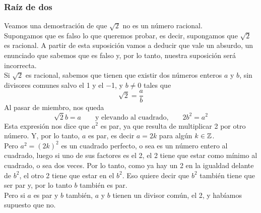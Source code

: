 \documentclass[../Teoría.root.tex]{subfiles}
\begin{document}
\subsubsection{Raíz de dos}
Veamos una demostración de que \(\sqrt{2}\) no es un número racional.\\
Supongamos que es falso lo que queremos probar, es decir, supongamos que \(\sqrt{2}\) es racional.
A partir de esta suposición vamos a deducir que vale un absurdo, un enunciado que sabemos que es falso y, por lo tanto, nuestra suposición será incorrecta.\\
Si \(\sqrt{2}\) es racional, sabemos que tienen que existir dos números enteros \(a\) y \(b\), sin divisores comunes salvo el 1 y el −1, y \(b \neq 0\) tales que \[\sqrt{2}=\frac{a}{b}\] Al pasar de miembro, nos queda
\[\sqrt{2}b=a\qquad\text{y elevando al cuadrado,}\qquad 2b^2=a^2\]
Esta expresión nos dice que \(a^2\) es par, ya que resulta de multiplicar 2 por otro número.
Y, por lo tanto, \(a\) es par, es decir \(a = 2k\) para algún \(k \in \mathbb{Z}\).\\
Pero \(a^2 = (2k)^2\) es un cuadrado perfecto, o sea es un número entero al cuadrado, luego si uno de sus factores es el 2, el 2 tiene que estar como mínimo al cuadrado, o sea dos veces.
Por lo tanto, como ya hay un 2 en la igualdad delante de \(b^2\), el otro 2 tiene que estar en el \(b^2\).
Eso quiere decir que \(b^2\) también tiene que ser par y, por lo tanto \(b\) también es par.\\
Pero si \(a\) es par y \(b\) también, \(a\) y \(b\) tienen un divisor común, el 2, y habíamos supuesto que no.
\end{document}
